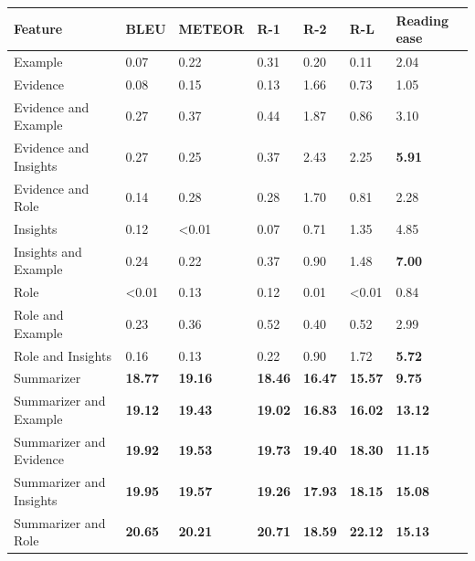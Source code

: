 \begin{tabular}{|l|l|l|l|l|l|l|}
\hline
\textbf{Feature} & BLEU & METEOR & R-1 & R-2 & R-L & Reading ease \\
 \hline
 Example & 0.07 & 0.22 & 0.31 & 0.20 & 0.11 & 2.04 \\
 \hline
 Evidence & 0.08 & 0.15 & 0.13 & 1.66 & 0.73 & 1.05 \\
 \hline
 Evidence and Example & 0.27 & 0.37 & 0.44 & 1.87 & 0.86 & 3.10 \\
 \hline
 Evidence and Insights & 0.27 & 0.25 & 0.37 & 2.43 & 2.25 & \textbf{5.91} \\
 \hline
 Evidence and Role & 0.14 & 0.28 & 0.28 & 1.70 & 0.81 & 2.28 \\
 \hline
 Insights & 0.12 & \textless{}0.01 & 0.07 & 0.71 & 1.35 & 4.85 \\
 \hline
 Insights and Example & 0.24 & 0.22 & 0.37 & 0.90 & 1.48 & \textbf{7.00} \\
 \hline
 Role & \textless{}0.01 & 0.13 & 0.12 & 0.01 & \textless{}0.01 & 0.84 \\
 \hline
 Role and Example & 0.23 & 0.36 & 0.52 & 0.40 & 0.52 & 2.99 \\
 \hline
 Role and Insights & 0.16 & 0.13 & 0.22 & 0.90 & 1.72 & \textbf{5.72} \\
 \hline
 Summarizer & \textbf{18.77} & \textbf{19.16} & \textbf{18.46} & \textbf{16.47} & \textbf{15.57} & \textbf{9.75} \\
 \hline
 Summarizer and Example & \textbf{19.12} & \textbf{19.43} & \textbf{19.02} & \textbf{16.83} & \textbf{16.02} & \textbf{13.12} \\
 \hline
 Summarizer and Evidence & \textbf{19.92} & \textbf{19.53} & \textbf{19.73} & \textbf{19.40} & \textbf{18.30} & \textbf{11.15} \\
 \hline
 Summarizer and Insights & \textbf{19.95} & \textbf{19.57} & \textbf{19.26} & \textbf{17.93} & \textbf{18.15} & \textbf{15.08} \\
 \hline
 Summarizer and Role & \textbf{20.65} & \textbf{20.21} & \textbf{20.71} & \textbf{18.59} & \textbf{22.12} & \textbf{15.13} \\
\hline
\end{tabular}
